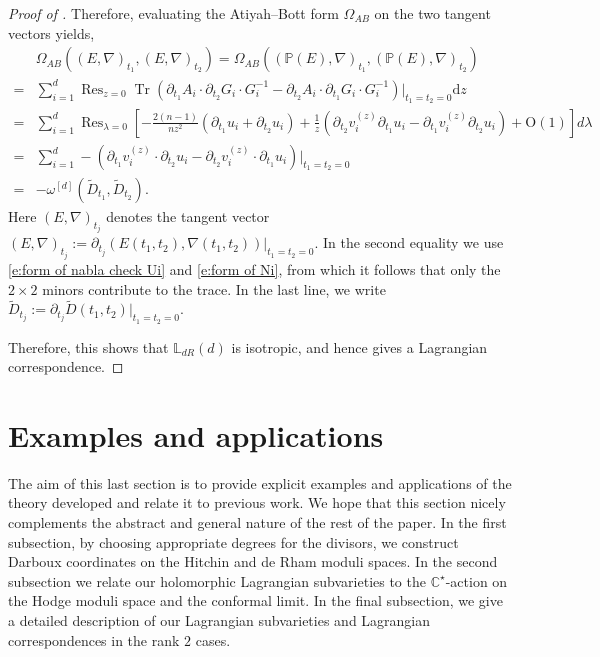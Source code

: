 \documentclass[twoside, 11pt]{article}
\numberwithin{equation}{section}
\theoremstyle{theorem}
\numberwithin{theorem}{section}
\theoremstyle{definition}
\newcommand{\C}{\mathbb C}
\begin{document}
\begin{proof}[Proof of ]
Therefore, evaluating the Atiyah--Bott form $\Omega_{AB}$ on the two
tangent vectors yields,
\begin{align*}
&\Omega_{AB} \left( (E,\nabla)_{t_1}, ( E,\nabla)_{t_2}\right)
= \Omega_{AB} \left( (\mathbb{P}(E),\nabla)_{t_1}, ( \mathbb{P}(E),\nabla)_{t_2}\right) \\
=& 
\sum_{i=1}^d \operatorname{Res}_{z=0} \operatorname{Tr}\left(
    \partial_{t_1} A_i \cdot \partial_{t_2} G_i
    \cdot G_i^{-1}
    - \partial_{t_2} A_i \cdot \partial_{t_1} G_i
    \cdot G_i^{-1}
\right) \Big|_{t_1=t_2=0} \mathrm{d}z \\
=& \sum_{i=1}^d \operatorname{Res}_{\lambda = 0} 
\left[
    -\frac{2(n-1)}{n z^2} \left( \partial_{t_1}u_i + \partial_{t_2}u_i \right)
    + 
    \frac{1}{z} \left( \partial_{t_2} v^{(z)}_i \partial_{t_1} u_i - \partial_{t_1} v^{(z)}_i \partial_{t_2} u_i \right)
    + 
    \mathrm{O}(1)
\right] d\lambda \\
=& \sum_{i=1}^d -\left(
    \partial_{t_1} v^{(z)}_i \cdot \partial_{t_2} u_i
    - \partial_{t_2} v^{(z)}_i \cdot \partial_{t_1} u_i
\right) \Big|_{t_1=t_2=0}\\
=& -\omega^{[d]} \left( \widetilde{D}_{t_1}, \widetilde{D}_{t_2} \right).
\end{align*}
Here $(E,\nabla)_{t_j}$ denotes the tangent vector
\(
(E,\nabla)_{t_j}
:=\partial_{t_j}(E(t_1,t_2),\nabla(t_1,t_2))\Big|_{t_1=t_2=0}.
\)
In the second equality we use \eqref{e:form of nabla check Ui} and
\eqref{e:form of Ni}, from which it follows that only the $2\times2$ minors
contribute to the trace.
In the last line, we write
\(
\widetilde D_{t_j}
:=\partial_{t_j}\widetilde D(t_1,t_2)\Big|_{t_1=t_2=0}.
\)

Therefore, this shows that $\mathbb L_{dR}(d)$ is isotropic, and hence gives a Lagrangian correspondence.
\end{proof}


\section{Examples and applications}
The aim of this last section is to provide explicit examples and applications of the theory developed and relate it to previous work. We hope that this section nicely complements the abstract and general nature of the rest of the paper. In the first subsection, by choosing appropriate degrees for the divisors, we construct Darboux coordinates on the Hitchin and de Rham moduli spaces. In the second subsection we relate our holomorphic Lagrangian subvarieties to the $\C^{\star}$-action on the Hodge moduli space and the conformal limit. In the final subsection, we give a detailed description of our Lagrangian subvarieties and Lagrangian correspondences in the rank $2$ cases. 
\end{document}
